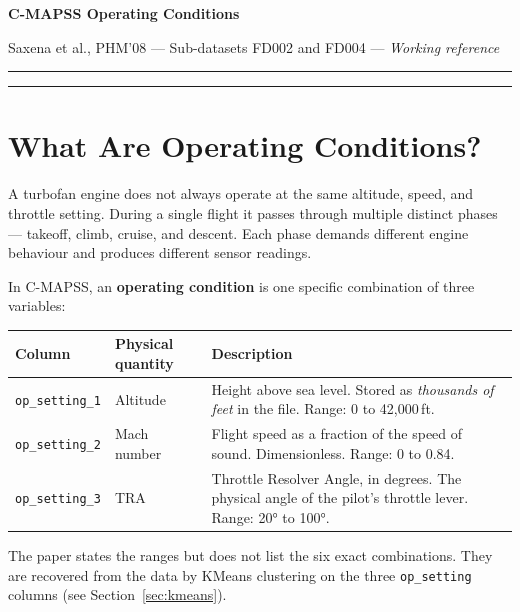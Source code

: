 \documentclass[11pt, a4paper]{article}
\begin{document}

{\Large\bfseries C-MAPSS Operating Conditions}

\smallskip
{\small Saxena et al., PHM'08 \quad --- \quad
Sub-datasets FD002 and FD004 \quad --- \quad
\textit{Working reference}}

\medskip\hrule\medskip

\tableofcontents

\bigskip\hrule\bigskip

\section{What Are Operating Conditions?}

A turbofan engine does not always operate at the same altitude,
speed, and throttle setting. During a single flight it passes
through multiple distinct phases --- takeoff, climb, cruise,
and descent. Each phase demands different engine behaviour and
produces different sensor readings.

In C-MAPSS, an \textbf{operating condition} is one specific
combination of three variables:

\begin{center}
\small
\begin{tabular}{@{}llp{8cm}@{}}
  \toprule
  Column & Physical quantity & Description \\
  \midrule
  \texttt{op\_setting\_1} & Altitude &
    Height above sea level. Stored as \emph{thousands of feet}
    in the file. Range: 0 to 42{,}000\,ft. \\[4pt]
  \texttt{op\_setting\_2} & Mach number &
    Flight speed as a fraction of the speed of sound.
    Dimensionless. Range: 0 to 0.84. \\[4pt]
  \texttt{op\_setting\_3} & TRA &
    Throttle Resolver Angle, in degrees.
    The physical angle of the pilot's throttle lever.
    Range: 20° to 100°. \\
  \bottomrule
\end{tabular}
\end{center}

The paper states the ranges but does not list the six exact
combinations. They are recovered from the data by
KMeans clustering on the three \texttt{op\_setting} columns
(see Section~\ref{sec:kmeans}).
\end{document}
